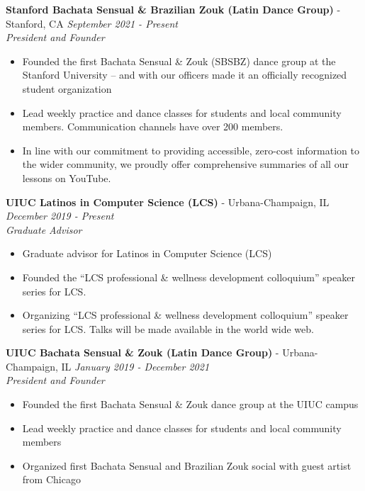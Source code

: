 \documentclass{article}
\newenvironment{changemargin}[2]{%
  \begin{list}{}{%
    \setlength{\topsep}{0pt}%
    \setlength{\leftmargin}{#1}%
    \setlength{\rightmargin}{#2}%
    \setlength{\listparindent}{\parindent}%
    \setlength{\itemindent}{\parindent}%
    \setlength{\parsep}{\parskip}%
  }%
  \item[]}{\end{list}
}
\newenvironment{body} {
	\vspace*{-16pt}
	\begin{changemargin}{-0.25in}{-0.5in}
  }	
	{\end{changemargin}
}
\begin{document}
\begin{body}
 	\textbf{Stanford Bachata Sensual \& Brazilian Zouk (Latin Dance Group)} - Stanford, CA \hfill \emph{September 2021 - Present}\\
	\emph{President and Founder}\\
	\vspace*{-3pt}
	\begin{itemize} \itemsep -2pt  %
    	\item Founded the first Bachata Sensual \& Zouk (SBSBZ) dance group at the Stanford University -- and with our officers made it an officially recognized student organization
    	\item Lead weekly practice and dance classes for students and local community members. Communication channels have over 200 members.
    	\item In line with our commitment to providing accessible, zero-cost information to the wider community, we proudly offer comprehensive summaries of all our lessons on YouTube.
	\end{itemize}
	\vspace{5 pt}
    
    \textbf{UIUC Latinos in Computer Science (LCS)} - Urbana-Champaign, IL \hfill \emph{December 2019 - Present}\\
	\emph{Graduate Advisor}\\
	\vspace*{-3pt}
	\begin{itemize} \itemsep -2pt  %
    	\item Graduate advisor for Latinos in Computer Science (LCS)
    	\item Founded the ``LCS professional \& wellness development colloquium'' speaker series for LCS.
    	\item Organizing ``LCS professional \& wellness development colloquium'' speaker series for LCS.
    	Talks will be made available in the world wide web.
	\end{itemize}
	\vspace{5 pt}
	
	\textbf{UIUC Bachata Sensual \& Zouk (Latin Dance Group)} - Urbana-Champaign, IL \hfill \emph{January 2019 - December 2021}\\
	\emph{President and Founder}\\
	\vspace*{-3pt}
	\begin{itemize} \itemsep -2pt  %
    	\item Founded the first Bachata Sensual \& Zouk dance group at the UIUC campus
    	\item Lead weekly practice and dance classes for students and local community members
    	\item Organized first Bachata Sensual and Brazilian Zouk social with guest artist from Chicago
	\end{itemize}
	\vspace{5 pt}
	

\end{body}
\end{document}
